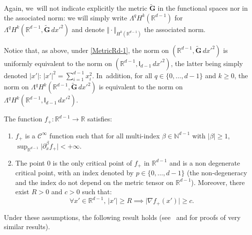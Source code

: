 \documentclass[JEP,XML,SOM,Unicode,NoEqCountersInSection,NoFloatCountersInSection,published]{cedram}
\newenvironment{enumeratei}
{\bgroup\def\theenumi{\roman{enumi}}\def\theenumii{\arabic{enumii}}\begin{enumerate}}
{\end{enumerate}\egroup}
\newcommand{\mbf}[1]{\mathbf{#1}}
\theoremstyle{plain}
\theoremstyle{definition}
\newenvironment{manualassumption}[1]{%
\renewcommand\themanualassumptioninner{#1}%
\manualassumptioninner}{\endmanualassumptioninner}
\begin{document}
Again, we~will not indicate explicitly the metric $\tilde {\mbf G}$ in the
functional spaces nor in the associated norm: we will simply write $\Lambda^q H^k(\mathbb
R^{d-1})$ for $\Lambda^qH^k(\mathbb R^{d-1}, \tilde {\mbf G} \, dx'^2)$ and denote $ \Vert \cdot \Vert_{H^k(\mathbb R^{d-1})}$ the
associated norm.

Notice that, as above, under \ref{MetricRd-1}, the norm on $(\mathbb
R^{d-1}, \tilde {\mbf G} \, dx'^2)$ is uniformly equivalent to the
norm on $(\mathbb R^{d-1}, \mathsf I_{d-1} \, dx'^2)$, the latter
being simply denoted $\vert x'\vert$: $\vert x'\vert^2=\sum_{i=1}^{d-1}x_i^2$. In~addition, for all $q\in \{0,\ldots,d-1\}$ and $k\ge 0$, the norm
on $\Lambda^qH^k(\mathbb R^{d-1}, \tilde {\mbf G} \, dx'^2)$ is
equivalent to the norm on $\Lambda^qH^k(\mathbb R^{d-1}, \mathsf I_{d-1} \, dx'^2)$.

\begin{manualassumption}{$(\textup{Potential-}\mathbb R^{d-1})$}\label{PotentialRd-1}
The function $f_+: {\mathbb R^{d-1}}\to \mathbb R$ satisfies:
\begin{enumeratei}
\item\label{PotentialRd-1i}
$f_+$ is a $\mathcal C^\infty$ function such that for all multi-index
$\beta\in \mathbb N^{d-1}$ with $\vert \beta\vert \ge 1$, $\sup_{\mathbb R^{d-1}}\vert \partial_x^\beta f_+\vert<+\infty$.
\item\label{PotentialRd-1ii}
The point $0$ is the only critical point of $f_+$ in ${\mathbb
R^{d-1}}$ and is a non degenerate critical point, with an index
denoted by $p\in
\{0,\ldots,d-1\}$ (the non-degeneracy and the index do not depend on the metric tensor
on $\mathbb R^{d-1}$). Moreover, there exist $R>0$ and $c>0$ such that:
\[
\forall x'\in \mathbb R^{d-1}, \, \vert x'\vert \ge R \implies \vert \nabla f_+(x')\vert \ge c.
\]
\end{enumeratei}
\end{manualassumption}

Under these assumptions, the following result holds (see~\cite[Prop.\,3.3.2 \&~3.3.3]{helffer-nier-06} and\cite[Prop.\,2.2]{HKN} for proofs of very similar results).
\end{document}
